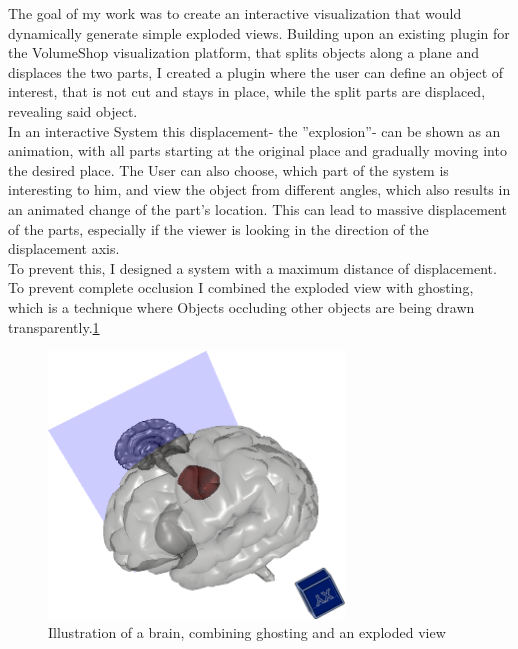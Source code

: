 The goal of my work was to create an interactive visualization that would dynamically generate simple exploded views. Building upon an existing plugin for the VolumeShop visualization platform, that splits objects along a plane and displaces the two parts,  I created a plugin where the user can define an object of interest, that is not cut and stays in place, while the split parts are displaced, revealing said object.\\
In an interactive System this displacement- the ''explosion''- can be shown as an animation, with all parts starting at the original place and gradually moving into the desired place. The User can also choose, which part of the system is interesting to him, and view the object from different angles, which also results in an animated change of the part's location. This can lead to massive displacement of the parts, especially if the viewer is looking in the direction of the displacement axis.\\
To prevent this,  I designed a system with a maximum distance of displacement. To prevent complete  occlusion I combined the exploded view with ghosting, which is a technique where Objects occluding other objects are being drawn transparently.\ref{fig:demo} \\
\begin{figure}[tb]
	\centering
	\includegraphics[width=0.7\textwidth]{chapters/figures/demo}
	\caption{Illustration of a brain, combining ghosting and an exploded view}
	\label{fig:demo}
\end{figure}